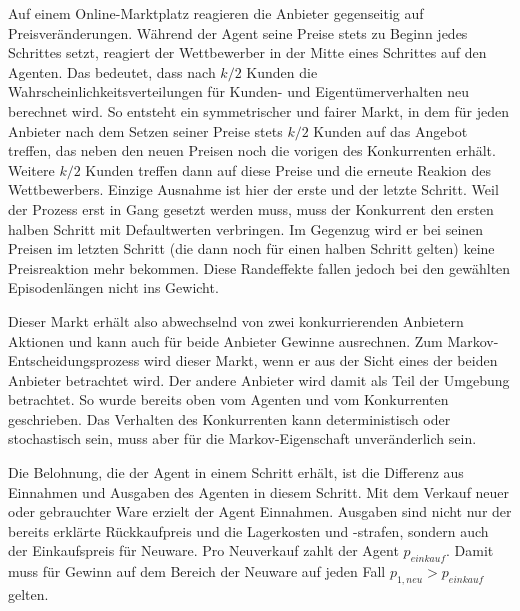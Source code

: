 Auf einem Online-Marktplatz reagieren die Anbieter gegenseitig auf Preisveränderungen.
Während der Agent seine Preise stets zu Beginn jedes Schrittes setzt, reagiert der Wettbewerber in der Mitte eines Schrittes auf den Agenten.
Das bedeutet, dass nach $k/2$ Kunden die Wahrscheinlichkeitsverteilungen für Kunden- und Eigentümerverhalten neu berechnet wird.
So entsteht ein symmetrischer und fairer Markt, in dem für jeden Anbieter nach dem Setzen seiner Preise stets $k/2$ Kunden auf das Angebot treffen, das neben den neuen Preisen noch die vorigen des Konkurrenten erhält.
Weitere $k/2$ Kunden treffen dann auf diese Preise und die erneute Reakion des Wettbewerbers.
Einzige Ausnahme ist hier der erste und der letzte Schritt.
Weil der Prozess erst in Gang gesetzt werden muss, muss der Konkurrent den ersten halben Schritt mit Defaultwerten verbringen.
Im Gegenzug wird er bei seinen Preisen im letzten Schritt (die dann noch für einen halben Schritt gelten) keine Preisreaktion mehr bekommen.
Diese Randeffekte fallen jedoch bei den gewählten Episodenlängen nicht ins Gewicht.

Dieser Markt erhält also abwechselnd von zwei konkurrierenden Anbietern Aktionen und kann auch für beide Anbieter Gewinne ausrechnen.
Zum Markov-Entscheidungsprozess wird dieser Markt, wenn er aus der Sicht eines der beiden Anbieter betrachtet wird.
Der andere Anbieter wird damit als Teil der Umgebung betrachtet.
So wurde bereits oben vom Agenten und vom Konkurrenten geschrieben.
Das Verhalten des Konkurrenten kann deterministisch oder stochastisch sein, muss aber für die Markov-Eigenschaft unveränderlich sein.

Die Belohnung, die der Agent in einem Schritt erhält, ist die Differenz aus Einnahmen und Ausgaben des Agenten in diesem Schritt.
Mit dem Verkauf neuer oder gebrauchter Ware erzielt der Agent Einnahmen.
Ausgaben sind nicht nur der bereits erklärte Rückkaufpreis und die Lagerkosten und -strafen, sondern auch der Einkaufspreis für Neuware.
Pro Neuverkauf zahlt der Agent $p_{einkauf}$.
Damit muss für Gewinn auf dem Bereich der Neuware auf jeden Fall $p_{1, neu} > p_{einkauf}$ gelten.

